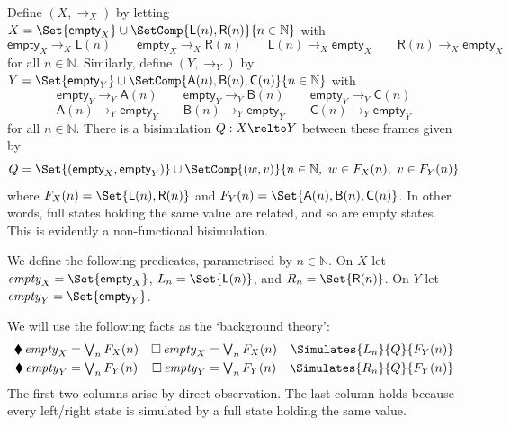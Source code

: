 \documentclass[10pt,a4paper]{article}
\begin{document}
Define $(X, \to_X)$ by letting
\(
  X = \Set{\textsf{empty}_X} \cup \SetComp{\textsf{L}(n), \textsf{R}(n)}{n \in \mathbb{N}}
\)
with 
\[
  \textsf{empty}_X \to_X \textsf{L}(n)
  \qquad
  \textsf{empty}_X \to_X \textsf{R}(n)
  \qquad
  \textsf{L}(n) \to_X \textsf{empty}_X
  \qquad
  \textsf{R}(n) \to_X \textsf{empty}_X
\]
for all \(n \in \mathbb{N}\). Similarly, define $(Y, \to_Y)$ by 
\(
  Y = \Set{\textsf{empty}_Y} \cup \SetComp{\textsf{A}(n), \textsf{B}(n), \textsf{C}(n)}{n \in \mathbb{N}}
\)
with
\[
  \textsf{empty}_Y \to_Y \textsf{A}(n)
  \qquad
  \textsf{empty}_Y \to_Y \textsf{B}(n)
  \qquad
  \textsf{empty}_Y \to_Y \textsf{C}(n)
\]
\[
  \textsf{A}(n) \to_Y \textsf{empty}_Y
  \qquad
  \textsf{B}(n) \to_Y \textsf{empty}_Y
  \qquad
  \textsf{C}(n) \to_Y \textsf{empty}_Y
\]
for all \(n \in \mathbb{N}\). There is a bisimulation \(Q : X \relto Y\) between
these frames given by
\[
  Q = \Set{(\textsf{empty}_X, \textsf{empty}_Y)} \cup \SetComp{(w, v)}{n \in \mathbb{N},\ w \in F_X(n),\ v \in F_Y(n)}
\]
where \(F_X(n) = \Set{\textsf{L}(n), \textsf{R}(n)}\) and \(F_Y(n) =
\Set{\textsf{A}(n), \textsf{B}(n), \textsf{C}(n)}\). In other words, full states
holding the same value are related, and so are empty states. This is evidently a
non-functional bisimulation.

We define the following predicates, parametrised by \(n \in \mathbb{N}\). On
\(X\) let \(\mathit{empty}_X = \Set{\textsf{empty}_X}\), \(L_n =
\Set{\textsf{L}(n)}\), and \(R_n = \Set{\textsf{R}(n)}\). On \(Y\) let
\(\mathit{empty}_Y = \Set{\textsf{empty}_Y}\).

We will use the following facts as the `background theory':
\begin{align*}
  \blacklozenge\, \mathit{empty}_X &= \textstyle\bigvee_{n} F_X(n)
  &
  \Box\, \mathit{empty}_X &= \textstyle\bigvee_n F_X(n)
  &
  \Simulates{L_n}{Q}{F_Y(n)}
  \\
  \blacklozenge\, \mathit{empty}_Y &= \textstyle\bigvee_n F_Y(n)
  &
  \Box\, \mathit{empty}_Y &= \textstyle\bigvee_n F_Y(n)
  &
  \Simulates{R_n}{Q}{F_Y(n)}
\end{align*}
The first two columns arise by direct observation. The last column holds because
every left/right state is simulated by a full state holding the same value.
\end{document}
